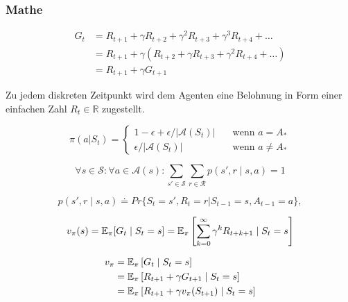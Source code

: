 \subsubsection*{Mathe}
\begin{equation}\label{eq:successiveReturn}
    \begin{aligned}
    G_t &= R_{t+1} + \gamma R_{t+2} + \gamma^2 R_{t+3} + \gamma^3 R_{t+4} + \dots \\
    &= R_{t+1} + \gamma (R_{t+2} + \gamma R_{t+3} + \gamma^2 R_{t+4} + \dots)  \\
   & = R_{t+1} + \gamma G_{t+1}
    \end{aligned}
\end{equation}

Zu jedem diskreten Zeitpunkt wird dem Agenten eine Belohnung in Form einer einfachen Zahl $R_t \in \mathbb{R}$ zugestellt.

\begin{equation}\label{eq:greedyProbs}
    \pi(a|S_t) =   
        \begin{cases}
            1-\epsilon + \epsilon / |\mathcal{A}(S_t)|      & \quad \text{wenn } a = A_* \\
            \epsilon / |\mathcal{A}(S_t)|  & \quad \text{wenn } a \neq A_*
        \end{cases}
\end{equation}

\begin{equation}\label{eq:wahrscheinlichkeitsverteilung}
    \forall s \in \mathcal{S}: \forall a \in \mathcal{A}(s):
\sum_{s' \in \mathcal{S}} \sum_{r \in \mathcal{R}} p(s', r \mid s,a) = 1 
\end{equation}

\begin{equation}\label{eq:übergangsfunktion}
p(s',r \mid s,a) \doteq Pr\{S_t=s',R_t=r|S_{t-1}=s,A_{t-1}=a\},
\end{equation}

\begin{equation}\label{eq:valueFunction}
    v_\pi(s) = \operatorname{\mathbb{E}}_\pi[G_t \mid S_t = s] = \operatorname{\mathbb{E}}_\pi \left[\sum_{k=0}^\infty{\gamma^k R_{t+k+1} \mid S_t = s} \right]
\end{equation}

\begin{equation}\label{eq:targets}
\begin{aligned}
v_\pi &= \operatorname{\mathbb{E}}_\pi\left[G_t \mid S_t = s \right] \\
&= \operatorname{\mathbb{E}}_\pi\left[R_{t+1} + \gamma G_{t+1} \mid S_t = s \right] \\
        &= \operatorname{\mathbb{E}}_\pi\left[R_{t+1} + \gamma v_\pi(S_{t+1}) \mid S_t = s \right]
\end{aligned}
\end{equation}

